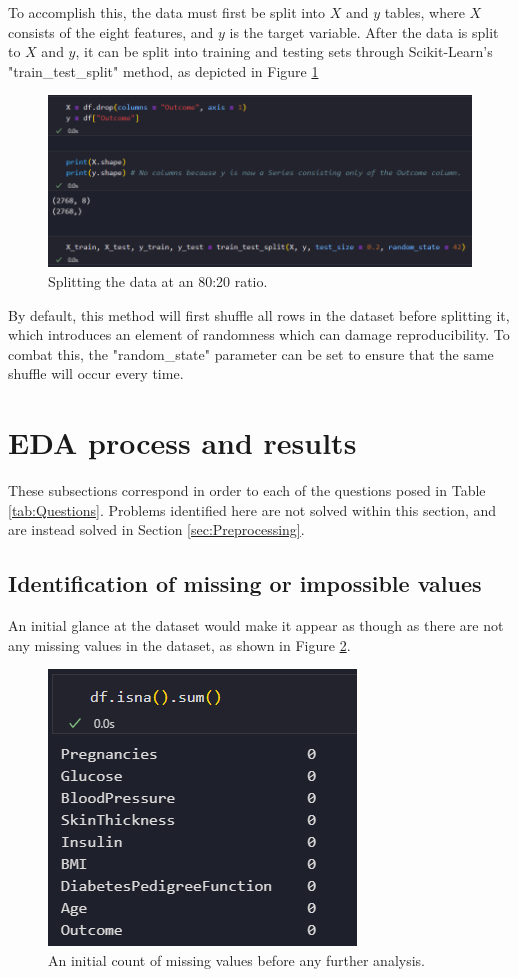 \documentclass[12pt]{report}
\newcommand{\para}{\vspace{8pt}\noindent}
\begin{document}
\para To accomplish this, the data must first be split into $X$ and $y$ tables, where $X$ consists of the eight features, and $y$ is the target variable.
After the data is split to $X$ and $y$, it can be split into training and testing sets through Scikit-Learn's "train\_test\_split" method, as depicted in Figure \ref{fig:TrainTestSplit}

\begin{figure}[H]
    \centering
    \includegraphics[width=\linewidth]{EDA/TrainTestSplit.png}
    \caption{Splitting the data at an 80:20 ratio.}
    \label{fig:TrainTestSplit}
\end{figure}

\para By default, this method will first shuffle all rows in the dataset before splitting it, which introduces an element of randomness which can damage 
reproducibility. To combat this, the "random\_state" parameter can be set to ensure that the same shuffle will occur every time.


\section{EDA process and results}
These subsections correspond in order to each of the questions posed in Table \ref{tab:Questions}. Problems identified here are not solved within this 
section, and are instead solved in Section \ref{sec:Preprocessing}.

\subsection{Identification of missing or impossible values}
An initial glance at the dataset would make it appear as though as there are not any missing values in the dataset, as shown in Figure \ref{fig:InitialNoNAs}.

\begin{figure}[H]
    \centering
    \includegraphics[width=.5\linewidth]{EDA/InitialNoNAs.png}
    \caption{An initial count of missing values before any further analysis.}
    \label{fig:InitialNoNAs}
\end{figure}
\end{document}
